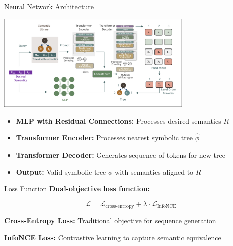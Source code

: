 \documentclass[aspectratio=1610]{beamer}
\begin{document}
    \begin{frame}{Neural Network Architecture}
        \begin{center}
            \includegraphics[width=0.7\textwidth]{figs/NN.pdf}
        \end{center}

        \begin{itemize}
            \item \textbf{MLP with Residual Connections:} Processes desired semantics $R$
            \item \textbf{Transformer Encoder:} Processes nearest symbolic tree $\hat{\phi}$
            \item \textbf{Transformer Decoder:} Generates sequence of tokens for new tree
            \item \textbf{Output:} Valid symbolic tree $\phi$ with semantics aligned to $R$
        \end{itemize}
    \end{frame}



    \begin{frame}{Loss Function}
        \textbf{Dual-objective loss function:}

        \begin{equation}
            \mathcal{L} = \mathcal{L}_{\text{cross-entropy}} + \lambda \cdot \mathcal{L}_{\text{InfoNCE}}
        \end{equation}

        \textbf{Cross-Entropy Loss:} Traditional objective for sequence generation

        \textbf{InfoNCE Loss:} Contrastive learning to capture semantic equivalence
    \end{frame}
\end{document}
